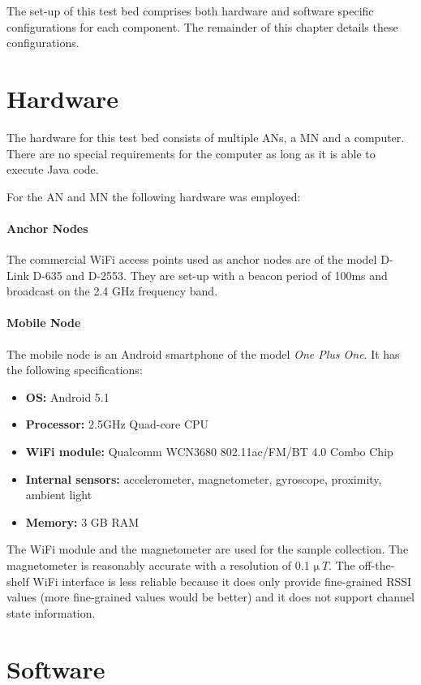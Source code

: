 The set-up of this test bed comprises both hardware and software specific configurations for each component. The remainder of this chapter details these configurations.

\section{Hardware}

The hardware for this test bed consists of multiple ANs, a MN and a computer. There are no special requirements for the computer as long as it is able to execute Java code.

For the AN and MN the following hardware was employed:

\paragraph{Anchor Nodes}
The commercial WiFi access points used as anchor nodes are of the model D-Link D-635 and D-2553. They are set-up with a beacon period of 100ms and broadcast on the 2.4 GHz frequency band.

\paragraph{Mobile Node}

The mobile node is an Android smartphone of the model \emph{One Plus One}. It has the following specifications:

\begin{itemize}
\item \textbf{OS:} Android 5.1
\item \textbf{Processor:} 2.5GHz Quad-core CPU
\item \textbf{WiFi module:} Qualcomm WCN3680 802.11ac/FM/BT 4.0 Combo Chip
\item \textbf{Internal sensors:} accelerometer, magnetometer, gyroscope, proximity, ambient light
\item \textbf{Memory:} 3 GB RAM
\end{itemize}

The WiFi module and the magnetometer are used for the sample collection. The magnetometer is reasonably accurate with a resolution of 0.1 $\si\micro\ T$. The off-the-shelf WiFi interface is less reliable because it does only provide fine-grained RSSI values (more fine-grained values would be better) and it does not support channel state information.

\section{Software}


